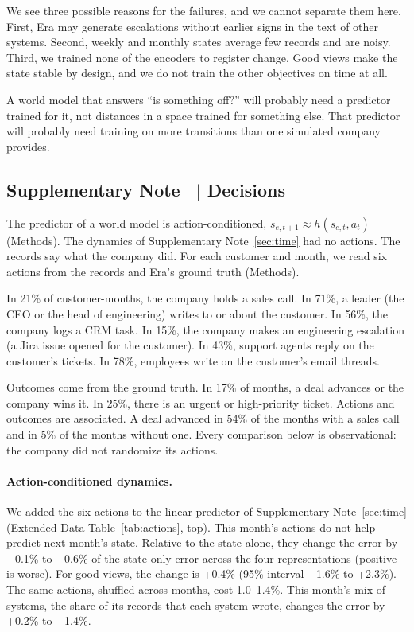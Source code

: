 \documentclass[11pt]{article}
\newcounter{suppnote}
\newcommand{\suppnote}[2]{\refstepcounter{suppnote}\label{#2}\subsection{Supplementary Note \thesuppnote\ $|$ #1}}
\begin{document}
We see three possible reasons for the failures, and we cannot separate them here. First, Era may generate escalations without earlier signs in the text of other systems. Second, weekly and monthly states average few records and are noisy. Third, we trained none of the encoders to register change. Good views make the state stable by design, and we do not train the other objectives on time at all.

A world model that answers ``is something off?'' will probably need a predictor trained for it, not distances in a space trained for something else. That predictor will probably need training on more transitions than one simulated company provides.

\suppnote{Decisions}{sec:decisions}
The predictor of a world model is action-conditioned, $s_{e,t+1} \approx h(s_{e,t}, a_t)$ (Methods). The dynamics of Supplementary Note~\ref{sec:time} had no actions. The records say what the company did. For each customer and month, we read six actions from the records and Era's ground truth (Methods).

In 21\% of customer-months, the company holds a sales call. In 71\%, a leader (the CEO or the head of engineering) writes to or about the customer. In 56\%, the company logs a CRM task. In 15\%, the company makes an engineering escalation (a Jira issue opened for the customer). In 43\%, support agents reply on the customer's tickets. In 78\%, employees write on the customer's email threads.

Outcomes come from the ground truth. In 17\% of months, a deal advances or the company wins it. In 25\%, there is an urgent or high-priority ticket. Actions and outcomes are associated. A deal advanced in 54\% of the months with a sales call and in 5\% of the months without one. Every comparison below is observational: the company did not randomize its actions.

\paragraph{Action-conditioned dynamics.} We added the six actions to the linear predictor of Supplementary Note~\ref{sec:time} (Extended Data Table~\ref{tab:actions}, top). This month's actions do not help predict next month's state. Relative to the state alone, they change the error by $-$0.1\% to +0.6\% of the state-only error across the four representations (positive is worse). For good views, the change is +0.4\% (95\% interval $-$1.6\% to +2.3\%). The same actions, shuffled across months, cost 1.0--1.4\%. This month's mix of systems, the share of its records that each system wrote, changes the error by +0.2\% to +1.4\%.
\end{document}
